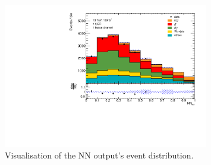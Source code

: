 \begin{figure}
    \centering
    \includegraphics[width=0.8\textwidth]{Plots/NN_out_mix_GANZ.pdf}
    \caption{Visualisation of the NN output's event distribution.}
    \label{fig:NNdistro2}
\end{figure}
